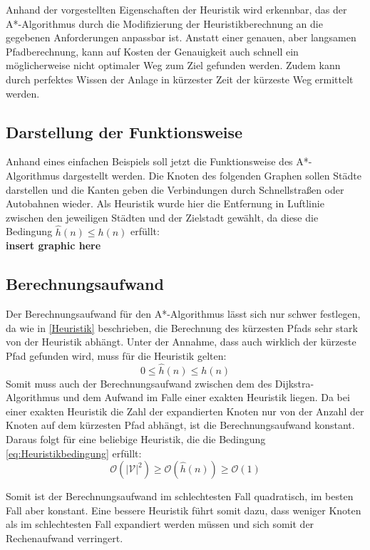 		Anhand der vorgestellten Eigenschaften der Heuristik wird erkennbar, das der A*-Algorithmus durch die Modifizierung der Heuristikberechnung an die gegebenen Anforderungen anpassbar ist. Anstatt einer genauen, aber langsamen Pfadberechnung, kann auf Kosten der Genauigkeit auch schnell ein möglicherweise nicht optimaler Weg zum Ziel gefunden werden. Zudem kann durch perfektes Wissen der Anlage in kürzester Zeit der kürzeste Weg ermittelt werden.
	
	\subsection{Darstellung der Funktionsweise}
		Anhand eines einfachen Beispiels soll jetzt die Funktionsweise des A*-Algorithmus dargestellt werden. Die Knoten des folgenden Graphen sollen Städte darstellen und die Kanten geben die Verbindungen durch Schnellstraßen oder Autobahnen wieder. Als Heuristik wurde hier die Entfernung in Luftlinie zwischen den jeweiligen Städten und der Zielstadt gewählt, da diese die Bedingung $\hat{h}(n)\le h(n)$ erfüllt:
		\\ \textbf{insert graphic here} 

	
	\subsection{Berechnungsaufwand}
		Der Berechnungsaufwand für den A*-Algorithmus lässt sich nur schwer festlegen, da wie in \ref{Heuristik} beschrieben, die Berechnung des kürzesten Pfads sehr stark von der Heuristik abhängt. Unter der Annahme, dass auch wirklich der kürzeste Pfad gefunden wird, muss für die Heuristik gelten:
		\begin{equation} \label{eq:Heuristikbedingung}
			0\le \hat{h}(n)\le h(n)
		\end{equation}
		Somit muss auch der Berechnungsaufwand zwischen dem des Dijkstra-Algorithmus und dem Aufwand im Falle einer exakten Heuristik liegen. Da bei einer exakten Heuristik die Zahl der expandierten Knoten nur von der Anzahl der Knoten auf dem kürzesten Pfad abhängt, ist die Berechnungsaufwand konstant. Daraus folgt für eine beliebige Heuristik, die die Bedingung \ref{eq:Heuristikbedingung} erfüllt:
		\begin{equation}
			\mathcal{O}(\lvert \mathcal{V}\rvert ^2)\ge \mathcal{O}(\hat{h}(n))\ge \mathcal{O}(1)
		\end{equation}
		
		Somit ist der Berechnungsaufwand im schlechtesten Fall quadratisch, im besten Fall aber konstant. Eine bessere Heuristik führt somit dazu, dass weniger Knoten als im schlechtesten Fall expandiert werden müssen und sich somit der Rechenaufwand verringert.
		

